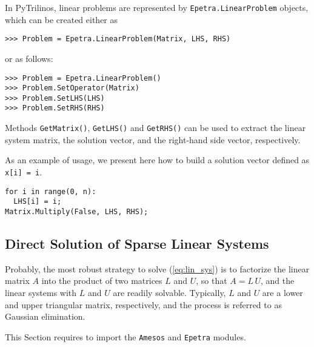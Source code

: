 \documentclass[10pt,relax]{SANDreport}
\newcommand{\PyTrilinos}{{PyTrilinos}}
\begin{document}
In \PyTrilinos, linear problems are represented by {\tt Epetra.LinearProblem}
objects, which can be created either as
\begin{verbatim}
>>> Problem = Epetra.LinearProblem(Matrix, LHS, RHS)
\end{verbatim}
or as follows:
\begin{verbatim}
>>> Problem = Epetra.LinearProblem()
>>> Problem.SetOperator(Matrix)
>>> Problem.SetLHS(LHS)
>>> Problem.SetRHS(RHS)
\end{verbatim}
Methods \verb!GetMatrix()!, \verb!GetLHS()! and \verb!GetRHS()! can be used to
extract the linear system matrix, the solution vector, and the right-hand side
vector, respectively.

As an example of usage, we present here how to build a solution vector
defined as \verb!x[i] = i!.
\begin{verbatim}
for i in range(0, n):
  LHS[i] = i;
Matrix.Multiply(False, LHS, RHS);
\end{verbatim}

\subsection{Direct Solution of Sparse Linear Systems}
\label{sec:direct}

Probably, the most robust strategy to solve (\ref{eq:lin_sys}) is to factorize
the linear matrix $A$ into the product of two matrices $L$ and $U$, so that
$A = L \, U$, and 
the linear systems with $L$ and $U$ are readily solvable. Typically,
$L$ and $U$ are a lower and upper triangular matrix, respectively, and the
process is referred to as Gaussian elimination. 

This Section requires to import the {\tt Amesos} and {\tt Epetra} modules.
\end{document}

